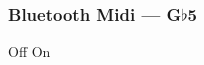 \subsubsection{Bluetooth Midi --- \UiKey{\SET}G$\flat$5}









































Off
On

